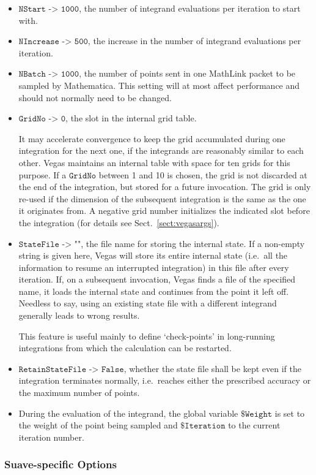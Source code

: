 \documentclass[12pt]{article}
\newcommand\ie{i.e.\ }
\newcommand\Code[1]{\ensuremath{\texttt{#1}}}
\newcommand\Option[2]{\item\Code{#1 -> #2},}
\begin{document}
\begin{itemize}
\Option{NStart}{1000}
the number of integrand evaluations per iteration to start with.

\Option{NIncrease}{500}
the increase in the number of integrand evaluations per iteration.

\Option{NBatch}{1000}
the number of points sent in one MathLink packet to be sampled by
Mathematica.  This setting will at most affect performance and should 
not normally need to be changed.

\Option{GridNo}{0}
the slot in the internal grid table.

It may accelerate convergence to keep the grid accumulated during one
integration for the next one, if the integrands are reasonably similar
to each other.  Vegas maintains an internal table with space for ten
grids for this purpose.  If a \Code{GridNo} between 1 and 10 is chosen,
the grid is not discarded at the end of the integration, but stored for
a future invocation.  The grid is only re-used if the dimension of the
subsequent integration is the same as the one it originates from.  
A negative grid number initializes the indicated slot before the
integration (for details see Sect.~\ref{sect:vegasargs}).

\Option{StateFile}{""}
the file name for storing the internal state.  If a non-empty string is
given here, Vegas will store its entire internal state (\ie all the
information to resume an interrupted integration) in this file after
every iteration.  If, on a subsequent invocation, Vegas finds a file of
the specified name, it loads the internal state and continues from the
point it left off.  Needless to say, using an existing state file with a
different integrand generally leads to wrong results.

This feature is useful mainly to define `check-points' in long-running
integrations from which the calculation can be restarted.

\Option{RetainStateFile}{False}
whether the state file shall be kept even if the integration terminates 
normally, \ie reaches either the prescribed accuracy or the maximum 
number of points.

\item
During the evaluation of the integrand, the global variable
\Code{\$Weight} is set to the weight of the point being sampled and
\Code{\$Iteration} to the current iteration number.
\end{itemize}


\subsubsection{Suave-specific Options}
\end{document}
